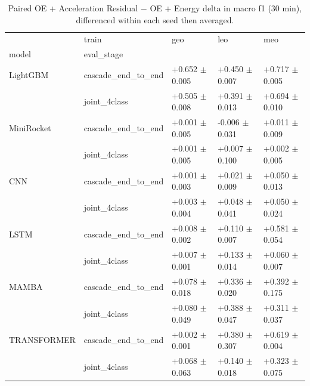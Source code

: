 \begin{table}
\centering
\caption{Paired OE + Acceleration Residual $-$ OE + Energy delta in macro f1 (30 min), differenced within each seed then averaged.}
\label{tab:featdelta_f1_ladder}
\begin{tabular}{lllll}
\toprule
            & train &                 geo &                 leo &                 meo \\
model & eval_stage &                     &                     &                     \\
\midrule
LightGBM & cascade_end_to_end &  +0.652 $\pm$ 0.005 &  +0.450 $\pm$ 0.007 &  +0.717 $\pm$ 0.005 \\
            & joint_4class &  +0.505 $\pm$ 0.008 &  +0.391 $\pm$ 0.013 &  +0.694 $\pm$ 0.010 \\
MiniRocket & cascade_end_to_end &  +0.001 $\pm$ 0.005 &  -0.006 $\pm$ 0.031 &  +0.011 $\pm$ 0.009 \\
            & joint_4class &  +0.001 $\pm$ 0.005 &  +0.007 $\pm$ 0.100 &  +0.002 $\pm$ 0.005 \\
CNN & cascade_end_to_end &  +0.001 $\pm$ 0.003 &  +0.021 $\pm$ 0.009 &  +0.050 $\pm$ 0.013 \\
            & joint_4class &  +0.003 $\pm$ 0.004 &  +0.048 $\pm$ 0.041 &  +0.050 $\pm$ 0.024 \\
LSTM & cascade_end_to_end &  +0.008 $\pm$ 0.002 &  +0.110 $\pm$ 0.007 &  +0.581 $\pm$ 0.054 \\
            & joint_4class &  +0.007 $\pm$ 0.001 &  +0.133 $\pm$ 0.014 &  +0.060 $\pm$ 0.007 \\
MAMBA & cascade_end_to_end &  +0.078 $\pm$ 0.018 &  +0.336 $\pm$ 0.020 &  +0.392 $\pm$ 0.175 \\
            & joint_4class &  +0.080 $\pm$ 0.049 &  +0.388 $\pm$ 0.047 &  +0.311 $\pm$ 0.037 \\
TRANSFORMER & cascade_end_to_end &  +0.002 $\pm$ 0.001 &  +0.380 $\pm$ 0.307 &  +0.619 $\pm$ 0.004 \\
            & joint_4class &  +0.068 $\pm$ 0.063 &  +0.140 $\pm$ 0.018 &  +0.323 $\pm$ 0.075 \\
\bottomrule
\end{tabular}
\end{table}
